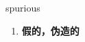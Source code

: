 
\begin{frame}
{\huge spurious}
\begin{center}
\begin{enumerate}\Large
  \item \textbf{假的，伪造的}
\end{enumerate}
\end{center}
\end{frame}
